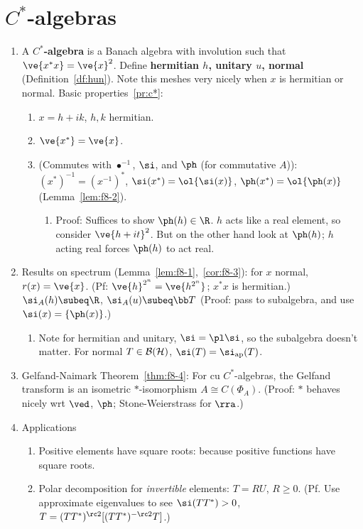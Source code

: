 \section{$C^*$-algebras}
\begin{enumerate}
\item
A \textbf{$C^*$-algebra} is a Banach algebra with involution such that $\ve{x^*x}=\ve{x}^2$. Define \textbf{hermitian $h$, unitary $u$, normal} (Definition~\ref{df:hun}). Note this meshes very nicely when $x$ is hermitian or normal. Basic properties~\ref{pr:c*}:
\begin{enumerate}
\item $x=h+ik$, $h,k$ hermitian.
\item $\ve{x^*}=\ve{x}$.
\item (Commutes with $\bullet^{-1}$, $\si$, and $\ph$ (for commutative $A$)): $(x^*)^{-1}=(x^{-1})^*$, $\si(x^*)=\ol{\si(x)}$, $\ph(x^*)=\ol{\ph(x)}$ (Lemma~\ref{lem:f8-2}).
\begin{enumerate}
\item
Proof: Suffices to show $\ph(h)\in \R$. $h$ acts like a real element, so consider $\ve{h+it}^2$. But on the other hand look at $\ph(h)$; $h$ acting real forces $\ph(h)$ to act real.
\end{enumerate}
\end{enumerate}
\item Results on spectrum (Lemma~\ref{lem:f8-1},~\ref{cor:f8-3}): for $x$ normal, $r(x)=\ve{x}$. (Pf: $\ve{h}^{2^n}=\ve{h^{2^n}}$; $x^*x$ is hermitian.) $\si_A(h)\subeq \R$, $\si_A(u)\subeq \bb T$ (Proof: pass to subalgebra, and use $\si(x)=\{\ph(x)\}$.)
\begin{enumerate}
\item
Note for hermitian and unitary, $\si=\pl \si$, so the subalgebra doesn't matter. For normal $T\in \cal B(H)$, $\si(T)=\si_{\text{ap}}(T)$.
\end{enumerate}
\item
Gelfand-Naimark Theorem~\ref{thm:f8-4}: For cu $C^*$-algebras, the Gelfand transform is an isometric $*$-isomorphism $A\cong C(\Phi_A)$. (Proof: $*$ behaves nicely wrt $\ved$, $\ph$; Stone-Weierstrass for $\rra$.)
\item
Applications


\begin{enumerate}
\item
Positive elements have square roots: because positive functions have square roots.
\item
Polar decomposition for {\it invertible} elements: $T=RU$, $R\ge 0$. (Pf. Use approximate eigenvalues to see $\si(TT^*)>0$, $T=(TT^*)^{\rc 2}[(TT^*)^{-\rc 2}T]$.)
\end{enumerate}
\end{enumerate}
